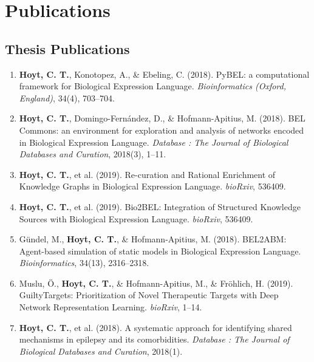 % 

\setlength{\parskip}{1em} %
\renewcommand{\baselinestretch}{1.2} %

% 

\chapter*{Publications}

\section*{Thesis Publications}

\begin{enumerate}
    \item \textbf{Hoyt, C. T.}, Konotopez, A., \& Ebeling, C. (2018). PyBEL: a computational framework for Biological Expression Language. \textit{Bioinformatics (Oxford, England)}, 34(4), 703–704.
    \item \textbf{Hoyt, C. T.}, Domingo-Fernández, D., \& Hofmann-Apitius, M. (2018). BEL Commons: an environment for exploration and analysis of networks encoded in Biological Expression Language. \textit{Database : The Journal of Biological Databases and Curation}, 2018(3), 1–11.
    \item \textbf{Hoyt, C. T.}, et al. (2019). Re-curation and Rational Enrichment of Knowledge Graphs in Biological Expression Language. \textit{bioRxiv}, 536409.
    \item \textbf{Hoyt, C. T.}, et al. (2019). Bio2BEL: Integration of Structured Knowledge Sources with Biological Expression Language. \textit{bioRxiv}, 536409.
    \item Gündel, M., \textbf{Hoyt, C. T.}, \& Hofmann-Apitius, M. (2018). BEL2ABM: Agent-based simulation of static models in Biological Expression Language. \textit{Bioinformatics}, 34(13), 2316–2318.
    \item Muslu, Ö., \textbf{Hoyt, C. T.}, \& Hofmann-Apitius, M., \& Fröhlich, H. (2019). GuiltyTargets: Prioritization of Novel Therapeutic Targets with Deep Network Representation Learning. \textit{bioRxiv}, 1–14.
    \item \textbf{Hoyt, C. T.}, et al. (2018). A systematic approach for identifying shared mechanisms in epilepsy and its comorbidities. \textit{Database : The Journal of Biological Databases and Curation}, 2018(1).
\end{enumerate}

